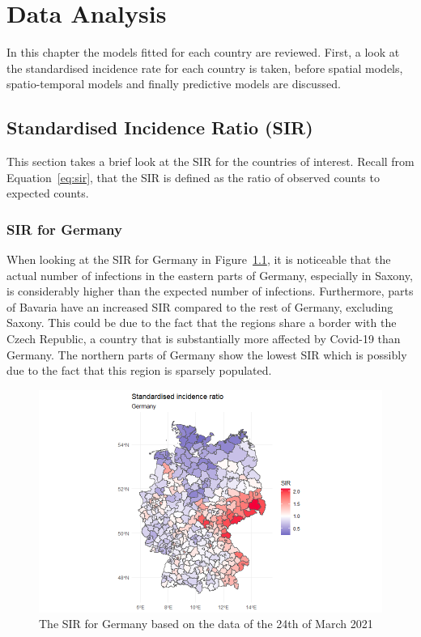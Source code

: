 %
\chapter{Data Analysis}
\label{sec:analysis}
In this chapter the models fitted for each country are reviewed. First, a look at the standardised incidence rate for each country is taken, before spatial models, spatio-temporal models and finally predictive models are discussed.
\section{Standardised Incidence Ratio (SIR)}
This section takes a brief look at the SIR for the countries of interest. Recall from Equation~\ref{eq:sir}, that the SIR is defined as the ratio of observed counts to expected counts.
\subsection{SIR for Germany}
When looking at the SIR for Germany in Figure~\ref{sirgermany}, it is noticeable that the actual number of infections in the eastern parts of Germany, especially in Saxony, is considerably higher than the expected number of infections. Furthermore, parts of Bavaria have an increased SIR compared to the rest of Germany, excluding Saxony. This could be due to the fact that the regions share a border with the Czech Republic, a country that is substantially more affected by Covid-19 than Germany. The northern parts of Germany show the lowest SIR which is possibly due to the fact that this region is sparsely populated.
%   
\begin{figure}[H]
  \centering
  \includegraphics[width = 1.2\textwidth]{sir_germany.png}
  \caption{The SIR for Germany based on the data of the 24th of March 2021}
  \label{sirgermany}
\end{figure}
